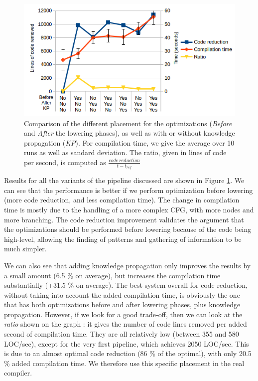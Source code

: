 \documentclass[12pt,a4paper]{article}
\newcommand{\perf}[1]{#1 \%}
\begin{document}
\begin{figure}
	\includegraphics[width=1.15\textwidth]{images/integration-side.png}
	\caption{Comparison of the different placement for the optimizations (\textit{Before} and \textit{After} the lowering phases), as well as with or without knowledge propagation (\textit{KP}). For compilation time, we give the average over 10 runs as well as sandard deviation. The ratio, given in lines of code per second, is computed as $\frac{code\ reduction}{t - t_{ref}}$}
	\label{fig:pipinteg}
\end{figure}

Results for all the variants of the pipeline discussed are shown in Figure \ref{fig:pipinteg}. We can see that the performance is better if we perform optimization before lowering (more code reduction, and less compilation time). The change in compilation time is mostly due to the handling of a more complex CFG, with more nodes and more branching. The code reduction improvement validates the argument that the optimizations should be performed before lowering because of the code being high-level, allowing the finding of patterns and gathering of information to be much simpler.

We can also see that adding knowledge propagation only improves the results by a small amount (\perf{6.5} on average), but increases the compilation time substantially (\perf{+31.5} on average). The best system overall for code reduction, without taking into account the added compilation time, is obviously the one that has both optimizations before and after lowering phases, plus knowledge propagation. However, if we look for a good trade-off, then we can look at the \textit{ratio} shown on the graph : it gives the number of code lines removed per added second of compilation time. They are all relatively low (between 355 and 580 LOC/sec), except for the very first pipeline, which achieves 2050 LOC/sec. This is due to an almost optimal code reduction (\perf{86} of the optimal), with only \perf{20.5} added compilation time. We therefore use this specific placement in the real compiler.
\end{document}
